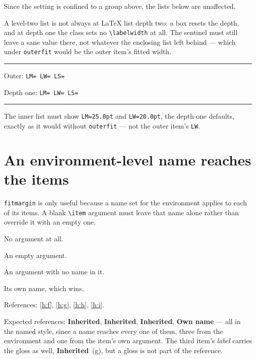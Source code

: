 \documentclass{article}
\newcommand\dims{\texttt{LM=\the\leftmargin\ LW=\the\labelwidth\
  LS=\the\labelsep}}
\begin{document}
Since the setting is confined to a group above, the lists below are unaffected.

A level-two list is not always at \LaTeX{} list depth two: a box resets the
depth, and at depth one the class sets no \verb|\labelwidth| at all.  The
sentinel must still leave a sane value there, not whatever the enclosing list
left behind --- which under \verb|outerfit| would be the outer item's fitted
width.

{
\noindent\rule{\textwidth}{0.3pt}
\begin{prop}
  \item Outer: \dims
  \par\noindent
  \begin{minipage}{0.7\textwidth}
    \begin{prop}
      \item Depth one: \dims
    \end{prop}
  \end{minipage}
\end{prop}
\noindent\rule{\textwidth}{0.3pt}
\par}

The inner list must show \texttt{LM=25.0pt} and \texttt{LW=20.0pt}, the depth-one
defaults, exactly as it would without \verb|outerfit| --- not the outer item's
\texttt{LW}.

\section{An environment-level name reaches the items}

\texttt{fitmargin} is only useful because a name set for the environment applies
to each of its items.  A blank \verb|\item| argument must leave that name alone
rather than override it with an empty one.

\begin{prop}[name=Inherited]
  \item No argument at all. \label{h:f}
  \item[] An empty argument. \label{h:g}
  \item[gloss=g] An argument with no name in it. \label{h:h}
  \item[Own name] Its own name, which wins. \label{h:i}
\end{prop}

References: \ref{h:f}, \ref{h:g}, \ref{h:h}, \ref{h:i}.

Expected references: \textbf{Inherited}, \textbf{Inherited},
\textbf{Inherited}, \textbf{Own name} --- all in the named style, since a name
reaches every one of them, three from the environment and one from the item's
own argument.  The third item's \emph{label} carries the gloss as well,
\textbf{Inherited}~(g), but a gloss is not part of the reference.
\end{document}
